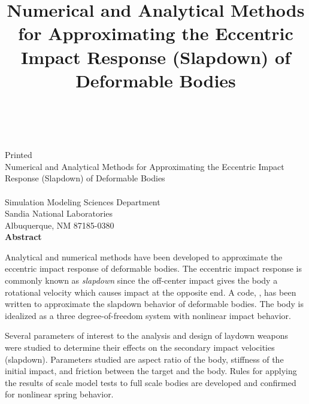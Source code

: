 \newif\ifdraft\draftfalse
\newif\ifsand\sandtrue

\SANDprintDate{\today}
\newcommand{\theTitle}{Numerical and Analytical Methods for Approximating the 
Eccentric Impact Response (Slapdown) of Deformable Bodies}

\title{\theTitle}
\ifsand
{}
\doCover
\newpage
\else
\SANDmarks{cover}
\setcounter{page}{3}
\fi


\begin{center}
\SANDnumVar\\
\SANDreleaseTypeVar\\
\ifdraft
Draft Date: \SANDprintDateVar\\
\else
Printed \SANDprintDateVar\\
\fi

\vspace{0.75in}
\theTitle\\
\vspace{0.5in}
\SANDauthorVar\\
Simulation Modeling Sciences Department\\
Sandia National Laboratories\\
Albuquerque, NM 87185-0380\\
\vspace*{.4in}
\textbf{Abstract}
\end{center}
\vspace{-.4cm}\par
Analytical and numerical methods have been developed to approximate
the eccentric impact response of deformable bodies.  The eccentric
impact response is commonly known as {\em slapdown} since the
off-center impact gives the body a rotational velocity which causes
impact at the opposite end.  A code, \SLAP , has been written to
approximate the slapdown behavior of deformable bodies. The body is
idealized as a three degree-of-freedom system with nonlinear impact
behavior. 

Several parameters of interest to the analysis and design of laydown
weapons were studied to determine their effects on the secondary
impact velocities (slapdown).  Parameters studied are aspect ratio of
the body, stiffness of the initial impact, and friction between the
target and the body. Rules for applying the results of scale model
tests to full scale bodies are developed and confirmed for nonlinear
spring behavior. 
